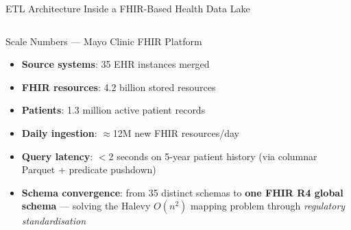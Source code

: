 \documentclass[aspectratio=169,10pt]{beamer}
\begin{document}
\begin{frame}{ETL Architecture Inside a FHIR-Based Health Data Lake}
\begin{columns}[T]
      \begin{exampleblock}{Scale Numbers — Mayo Clinic FHIR Platform}
        \begin{itemize}
          \item \textbf{Source systems}: 35 EHR instances merged
          \item \textbf{FHIR resources}: 4.2 billion stored resources
          \item \textbf{Patients}: 1.3 million active patient records
          \item \textbf{Daily ingestion}: $\approx$12M new FHIR resources/day
          \item \textbf{Query latency}: $<$2 seconds on 5-year patient history
                (via columnar Parquet + predicate pushdown)
          \item \textbf{Schema convergence}: from 35 distinct schemas
                to \textbf{one FHIR R4 global schema}
                — solving the Halevy $O(n^2)$ mapping problem
                through \emph{regulatory standardisation}
        \end{itemize}
      \end{exampleblock}
  \end{columns}
\end{frame}
\end{document}
